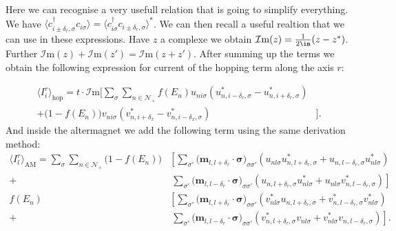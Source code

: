 \documentclass[../main.tex]{subfile}
\begin{document}
Here we can recognise a very usefull relation that is going to simplify everything. We have $\langle c_{i\pm\delta_r,\sigma}^{\dagger} c_{i\sigma}\rangle = \langle c_{i\sigma}^{\dagger}c_{i\pm\delta_{r},\sigma} \rangle^{\ast}$.
We can then recall a useful realtion that we can use in these expressions. Have $z$ a complexe we obtain $\mathcal{I}\text{m}(z) = \frac{1}{2\im}(z-z^{\ast})$. Further $\mathcal{I}\text{m}(z)+\mathcal{I}\text{m}(z') = \mathcal{I}\text{m}(z+z')$.
After summing up the terms we obtain the following expression for current of the hopping term along the axis $r$:

\begin{equation}
    \begin{aligned}
        \langle I_i^r\rangle_{\text{hop}} = t\cdot\mathcal{I}\text{m}\biggl[ \sum_{\sigma}\sum_{n\in\mathcal{N}_+} 
            f(E_n)u_{ni\sigma}\left(u_{n,i-\delta_r,\sigma}^{\ast} - u_{n,i+\delta_r,\sigma}^{\ast}\right) &\\
            +\bigl(1-f(E_n)\bigr) v_{ni\sigma}\left(v_{n,i+\delta_x}^{\ast} - v_{n,i-\delta_x,\sigma}^{\ast}\right)&\biggr].
    \end{aligned}
\end{equation}
And inside the altermagnet we add the following term using the same derivation method:
\begin{equation*}
    \begin{aligned}
    \langle I_l^r\rangle_{\text{AM}} = \sum_{\sigma}\sum_{n\in\mathcal{N}_+} \bigl(1-f(E_n)) 
    &\left[ \sum _{\sigma'}\bigl(\bm{m}_{l,l+\delta_r}\cdot\bm{\sigma}\bigr)_{\sigma\sigma'} \left(u_{nl\sigma} u_{n,l+\delta_r,\sigma}^{\ast}  + u_{n,l-\delta_r,\sigma}u_{nl\sigma}^{\ast}\right)\right.\\
    +&~\left.\sum _{\sigma'}\bigl(\bm{m}_{l,l-\delta_r}\cdot\bm{\sigma}\bigr)_{\sigma\sigma'} \left(u_{n,l+\delta_r,\sigma} u_{nl\sigma}^{\ast} + u_{nl\sigma}v_{n,l-\delta_r,\sigma}^{\ast}\right)\right]\\
    f(E_n)&\left[ \sum _{\sigma'}\bigl(\bm{m}_{l,l+\delta_r}\cdot\bm{\sigma}\bigr)_{\sigma\sigma'} \left(v_{nl\sigma}^{\ast} u_{n,l+\delta_r,\sigma}  + v_{n,l-\delta_r,\sigma}^{\ast}v_{nl\sigma}^{\ast}\right)\right.\\
    +&~\left.\sum _{\sigma'}\bigl(\bm{m}_{l,l-\delta_r}\cdot\bm{\sigma}\bigr)_{\sigma\sigma'} \left(v_{n,l+\delta_r,\sigma}^{\ast} v_{nl\sigma} + v_{nl\sigma}^{\ast}v_{n,l-\delta_r,\sigma}\right)\right].
    \end{aligned}
\end{equation*}
\end{document}
